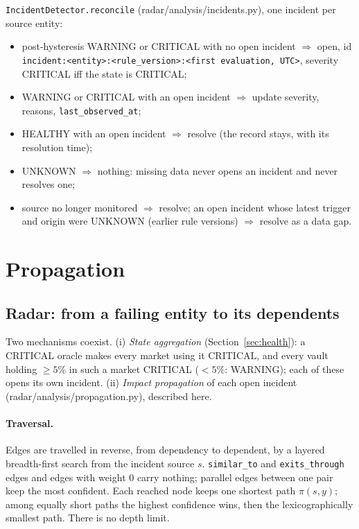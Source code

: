 \documentclass[11pt,a4paper]{article}
\newcommand{\code}[1]{\texttt{#1}}
\newcommand{\src}[1]{\textsf{\small #1}}
\begin{document}
\code{IncidentDetector.reconcile} (\src{radar/analysis/incidents.py}), one incident
per source entity:
\begin{itemize}
\item post-hysteresis WARNING or CRITICAL with no open incident $\Rightarrow$ open,
  id \code{incident:<entity>:<rule\_version>:<first evaluation, UTC>}, severity
  CRITICAL iff the state is CRITICAL;
\item WARNING or CRITICAL with an open incident $\Rightarrow$ update severity, reasons,
  \code{last\_observed\_at};
\item HEALTHY with an open incident $\Rightarrow$ resolve (the record stays, with its resolution time);
\item UNKNOWN $\Rightarrow$ nothing: missing data never opens an incident and never
  resolves one;
\item source no longer monitored $\Rightarrow$ resolve; an open incident whose latest
  trigger and origin were UNKNOWN (earlier rule versions) $\Rightarrow$ resolve as a
  data gap.
\end{itemize}

\section{Propagation}

\subsection{Radar: from a failing entity to its dependents}

Two mechanisms coexist. (i) \emph{State aggregation}
(Section~\ref{sec:health}): a CRITICAL oracle makes every market using it
CRITICAL, and every vault holding $\geq5\%$ in such a market CRITICAL ($<5\%$:
WARNING); each of these opens its own incident. (ii) \emph{Impact propagation}
of each open incident (\src{radar/analysis/propagation.py}), described here.

\paragraph{Traversal.} Edges are travelled in reverse, from dependency to
dependent, by a layered breadth-first search from the incident source $s$.
\code{similar\_to} and \code{exits\_through} edges and edges with weight 0 carry
nothing; parallel edges between one pair keep the most confident. Each reached
node keeps one shortest path $\pi(s,y)$; among equally short paths the highest
confidence wins, then the lexicographically smallest path. There is no depth
limit.
\end{document}
